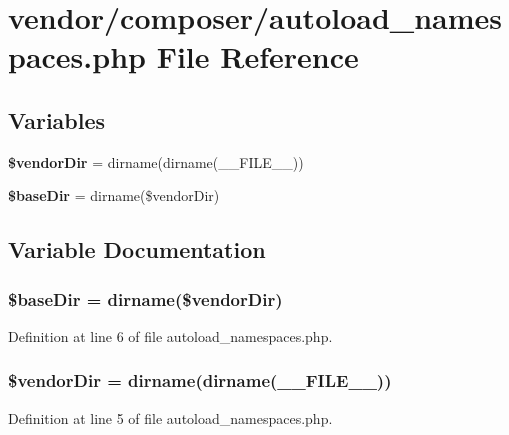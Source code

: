 \section{vendor/composer/autoload\+\_\+namespaces.php File Reference}
\label{autoload__namespaces_8php}
\subsection*{Variables}
\begin{DoxyCompactItemize}
\item 
{\bf \$vendor\+Dir} = dirname(dirname(\+\_\+\+\_\+\+F\+I\+L\+E\+\_\+\+\_\+))
\item 
{\bf \$base\+Dir} = dirname(\$vendor\+Dir)
\end{DoxyCompactItemize}


\subsection{Variable Documentation}
\subsubsection[{\$base\+Dir}]{\setlength{\rightskip}{0pt plus 5cm}\$base\+Dir = dirname(\$vendor\+Dir)}\label{autoload__namespaces_8php_a873fc20cf44ad2f766893e95aab8df78}


Definition at line 6 of file autoload\+\_\+namespaces.\+php.

\subsubsection[{\$vendor\+Dir}]{\setlength{\rightskip}{0pt plus 5cm}\$vendor\+Dir = dirname(dirname(\+\_\+\+\_\+\+F\+I\+L\+E\+\_\+\+\_\+))}\label{autoload__namespaces_8php_a7fbc3633c79d7461383710e09d497fb0}


Definition at line 5 of file autoload\+\_\+namespaces.\+php.


